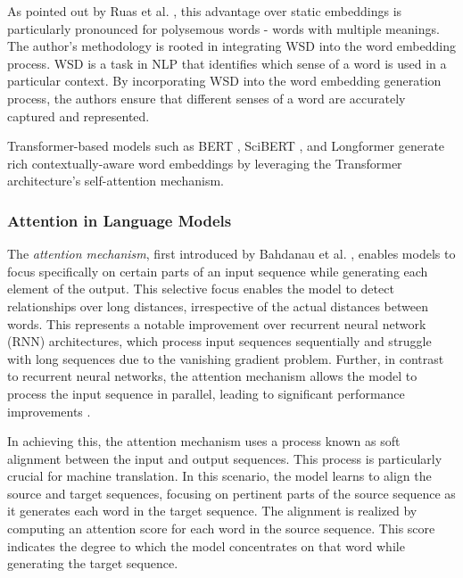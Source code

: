 As pointed out by Ruas et al. \cite{RuasMultisenseEmbeddings2019}, this advantage over static embeddings is particularly pronounced for polysemous words - words with multiple meanings. The author's methodology is rooted in integrating \ac{WSD} into the word embedding process. \ac{WSD} is a task in \ac{NLP} that identifies which sense of a word is used in a particular context. By incorporating \ac{WSD} into the word embedding generation process, the authors ensure that different senses of a word are accurately captured and represented.

Transformer-based models \cite{VaswaniAttentionAll2017} such as BERT \cite{DevlinBERTPretraining2019}, SciBERT \cite{BeltagySciBERTPretrained2019}, and Longformer \cite{BeltagyLongformerLongDocument2020} generate rich contextually-aware word embeddings by leveraging the Transformer architecture's self-attention mechanism.


\subsubsection*{Attention in Language Models}

The \emph{attention mechanism}, first introduced by Bahdanau et al. \cite{BahdanauNeuralMachine2016}, enables models to focus specifically on certain parts of an input sequence while generating each element of the output. This selective focus enables the model to detect relationships over long distances, irrespective of the actual distances between words. This represents a notable improvement over recurrent neural network (RNN) architectures, which process input sequences sequentially and struggle with long sequences due to the vanishing gradient problem.
Further, in contrast to recurrent neural networks, the attention mechanism allows the model to process the input sequence in parallel, leading to significant performance improvements \cite{VaswaniAttentionAll2017,AlammarIllustratedTransformer2018}.

In achieving this, the attention mechanism uses a process known as soft alignment between the input and output sequences. This process is particularly crucial for machine translation. In this scenario, the model learns to align the source and target sequences, focusing on pertinent parts of the source sequence as it generates each word in the target sequence. The alignment is realized by computing an attention score for each word in the source sequence. This score indicates the degree to which the model concentrates on that word while generating the target sequence.

